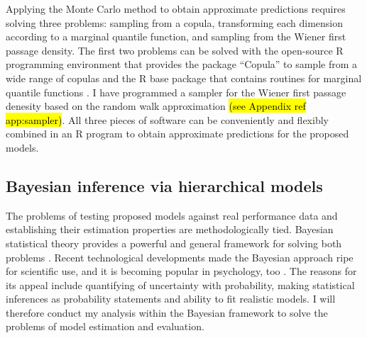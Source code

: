 \documentclass[12pt]{article}
\newcommand{\trish}[1]{\textrm{\hl{#1}}}
\begin{document}
Applying the Monte Carlo method to obtain approximate
predictions requires solving three problems: sampling from a copula,
transforming each dimension according to a marginal quantile function,
and sampling from the Wiener first passage density. The first two
problems can be solved with the open-source R programming environment
that provides the package ``Copula'' to sample from a wide range of
copulas and the R base package that contains routines for marginal
quantile functions \citep{Rte2012,HofKoj2013}. I have
programmed a sampler for the Wiener first passage denesity based on the
random walk approximation \citep{TueMar2001}
\trish{(see
Appendix ref app:sampler)}. All three pieces of software
can be conveniently and flexibly combined in an R program to obtain
approximate predictions for the proposed models.

\subsection{Bayesian inference via hierarchical models}

The problems of testing proposed models against real performance data
and establishing their estimation properties are methodologically
tied. Bayesian statistical theory provides a powerful and general
framework for solving both problems \citep{Ber1997,GelCar2013}. Recent
technological developments made the Bayesian approach ripe for
scientific use, and it is becoming popular in psychology, too
\citep{EdwLin1963,MyuPit1997,MyuKar2008,PerVan2002,RouLu2005,RouLu22005,CraPer2010,VanTue2011}. The
reasons for its appeal include quantifying of uncertainty with
probability, making statistical inferences as probability statements and ability to fit realistic models. I will
therefore conduct my analysis within the Bayesian framework to
solve the problems of model estimation and evaluation.
\end{document}
